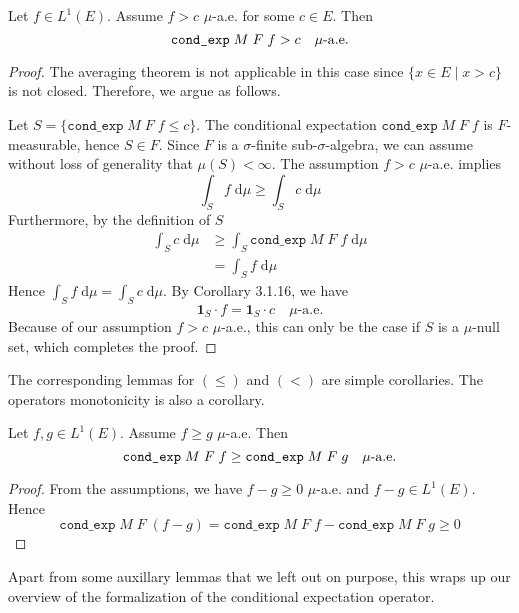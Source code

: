 \begin{lemma}
	Let $f \in L^1(E)$. Assume $f > c$ $\mu$-a.e. for some $c \in E$. Then 
	\[
		\normalfont\texttt{cond\_exp} \; M \; F \; f > c \quad \mu\textrm{-a.e.}
	\]
\end{lemma}
\begin{proof}
	The averaging theorem is not applicable in this case since $\{x \in E \;\vert\; x > c \}$ is not closed. Therefore, we argue as follows.
	
	Let $S = \{\texttt{cond\_exp} \; M \; F \; f \le c\}$. The conditional expectation $\texttt{cond\_exp} \; M \; F \; f$ is $F$-measurable, hence $S \in F$. Since $F$ is a $\sigma$-finite sub-$\sigma$-algebra, we can assume without loss of generality that $\mu(S) < \infty$.
	The assumption $f > c$ $\mu$-a.e. implies
	\[
		\int_S f \; \textrm{d} \mu \ge \int_S c \; \textrm{d} \mu
	\]
	Furthermore, by the definition of $S$
	\begin{align*}
		\int_S c \; \textrm{d} \mu &\ge \int_S \texttt{cond\_exp} \; M \; F \; f \; \textrm{d} \mu \\
		&= \int_S f \; \textrm{d} \mu
	\end{align*}
	Hence $\int_S f \; \textrm{d} \mu = \int_S c \; \textrm{d} \mu$. By Corollary 3.1.16, we have
	\[
		\mathbf{1}_S \cdot f = \mathbf{1}_S \cdot c \quad \mu\textrm{-a.e.}
	\]
	Because of our assumption $f > c$ $\mu$-a.e., this can only be the case if $S$ is a $\mu$-null set, which completes the proof.
\end{proof}

The corresponding lemmas for $(\le)$ and $(<)$ are simple corollaries. The operators monotonicity is also a corollary.

\begin{corollary}
	Let $f, g \in L^1(E)$. Assume $f \ge g$ $\mu$-a.e. Then 
	\[
		\normalfont\texttt{cond\_exp} \; M \; F \; f \ge \texttt{cond\_exp} \; M \; F \; g \quad \mu\textrm{-a.e.}
	\]
\end{corollary}
\begin{proof}
	From the assumptions, we have $f - g \ge 0$ $\mu$-a.e. and $f - g \in L^1(E)$. Hence
	\[
		\texttt{cond\_exp} \; M \; F \; (f - g) = \texttt{cond\_exp} \; M \; F \; f - \texttt{cond\_exp} \; M \; F \; g \ge 0
	\]
\end{proof}

Apart from some auxillary lemmas that we left out on purpose, this wraps up our overview of the formalization of the conditional expectation operator.
